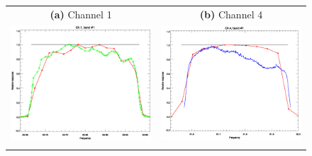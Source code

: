 \begin{figure}[htp]
  \centering
  \begin{tabular}{c c}
    \textsf{\textbf{(a)} Channel 1} &
    \textsf{\textbf{(b)} Channel 4} \\
    \includegraphics[scale=0.5]{graphics/srf/atms_npp.ch1.srf.eps} &
    \includegraphics[scale=0.5]{graphics/srf/atms_npp.ch4.srf.eps} \\\\


\end{tabular}
\end{figure}
